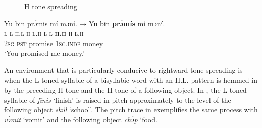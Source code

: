 \begin{figure}
\caption{H tone spreading}
\label{fig:key:3.11}
\end{figure}
 


\ea%
    \label{ex:key:50}
    \glll   Yu  bin  prɔ́mis  mí    mɔní.  →    Yu  bin  \textbf{prɔ́m\'is}  mí  mɔní.\\
\textsc{l}  \textsc{l}  \textsc{h.l}    \textsc{h}    \textsc{l.h}    {}    \textsc{l}  \textsc{l}  \textbf{\textsc{h.h}}    \textsc{h}  \textsc{l.h}\\
\textsc{2sg}  \textsc{pst}  promise  \textsc{1sg.indp}  money\\
\glt ‘You promised me money.’
\z

An environment that is particularly conducive to rightward tone spreading is when the L-toned syllable of a bisyllabic word with an H.L. pattern is hemmed in by the preceding H tone and the H tone of a following object. In , the L-toned syllable of \textit{fínis} ‘finish’ is raised in pitch approximately to the level of the following object \textit{skúl} ‘school’. The pitch trace in  exemplifies the same process with \textit{vɔ́mit} ‘vomit’ and the following object \textit{chɔ́p} ‘food.


